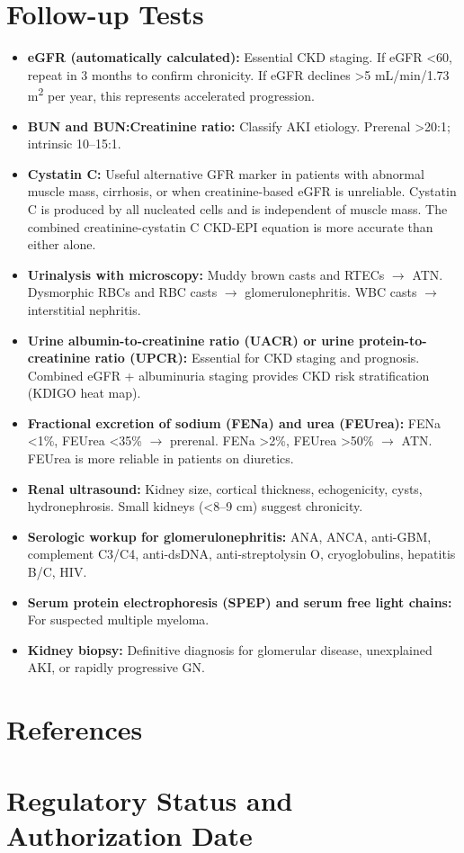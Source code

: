 \section*{Follow-up Tests}
\begin{itemize}
  \item \textbf{eGFR (automatically calculated):} Essential CKD staging. If eGFR <60, repeat in 3 months to confirm chronicity. If eGFR declines >5 mL/min/1.73 m\textsuperscript{2} per year, this represents accelerated progression.
  \item \textbf{BUN and BUN:Creatinine ratio:} Classify AKI etiology. Prerenal >20:1; intrinsic 10--15:1.
  \item \textbf{Cystatin C:} Useful alternative GFR marker in patients with abnormal muscle mass, cirrhosis, or when creatinine-based eGFR is unreliable. Cystatin C is produced by all nucleated cells and is independent of muscle mass. The combined creatinine-cystatin C CKD-EPI equation is more accurate than either alone.
  \item \textbf{Urinalysis with microscopy:} Muddy brown casts and RTECs $\rightarrow$ ATN. Dysmorphic RBCs and RBC casts $\rightarrow$ glomerulonephritis. WBC casts $\rightarrow$ interstitial nephritis.
  \item \textbf{Urine albumin-to-creatinine ratio (UACR) or urine protein-to-creatinine ratio (UPCR):} Essential for CKD staging and prognosis. Combined eGFR + albuminuria staging provides CKD risk stratification (KDIGO heat map).
  \item \textbf{Fractional excretion of sodium (FENa) and urea (FEUrea):} FENa <1\%, FEUrea <35\% $\rightarrow$ prerenal. FENa >2\%, FEUrea >50\% $\rightarrow$ ATN. FEUrea is more reliable in patients on diuretics.
  \item \textbf{Renal ultrasound:} Kidney size, cortical thickness, echogenicity, cysts, hydronephrosis. Small kidneys (<8--9 cm) suggest chronicity.
  \item \textbf{Serologic workup for glomerulonephritis:} ANA, ANCA, anti-GBM, complement C3/C4, anti-dsDNA, anti-streptolysin O, cryoglobulins, hepatitis B/C, HIV.
  \item \textbf{Serum protein electrophoresis (SPEP) and serum free light chains:} For suspected multiple myeloma.
  \item \textbf{Kidney biopsy:} Definitive diagnosis for glomerular disease, unexplained AKI, or rapidly progressive GN.
\end{itemize}

\section*{References}



\clearpage
\section*{Regulatory Status and Authorization Date}

\clearpage
